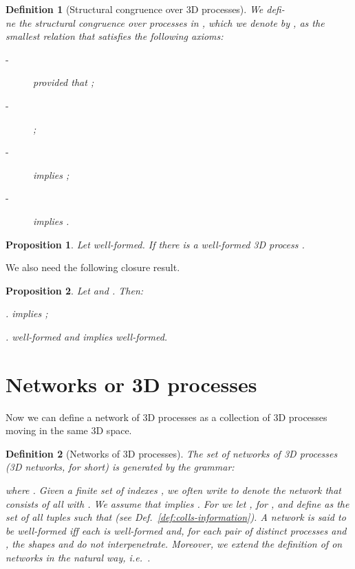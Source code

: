 \documentclass[11pt]{article}
\newtheorem{definition}{Definition}
\newtheorem{proposition}{Proposition}
\begin{document}
\begin{definition}[Structural congruence over 3D processes] \label{def:congruence3d}
We defi-\\ne the structural congruence over processes in , which we denote by
, as the smallest relation that satisfies the following axioms:
\begin{description}

\item [-]   provided that ;

\item [-] ;

\item [-]  implies ;

\item  [-]  implies .
\end{description}
\end{definition}
\begin{proposition}\label{prop:splitwf}
Let  well-formed. If  there is a well-formed 3D
process .
\end{proposition}
We also need the following closure result.
\begin{proposition}\label{prop:closure-splittings}
Let   and . Then:

.  implies ;

.  well-formed and  implies  well-formed.
\end{proposition}


\section{Networks or 3D processes}\label{sec:networks}

Now we can define a network of 3D processes as a collection of 3D processes moving in
the same 3D space.

\begin{definition}[Networks of 3D processes]
\label{def:networks}
The set  of {\em networks of 3D processes} (3D networks, for short) is generated by the
grammar:

where . Given a finite set of indexes , we often write 
to denote the network that consists of all  with . We assume that 
implies . For  we let ,
for , and define  as the set of all tuples   such that  (see Def.~\ref{def:colls-information}).
A network  is said to be well-formed iff each  is well-formed and,
for each pair of distinct processes  and , the shapes  and  {\em do not
interpenetrate}. Moreover, we extend the definition of  on networks in the natural way,
i.e.\ .
\end{definition}
\end{document}
